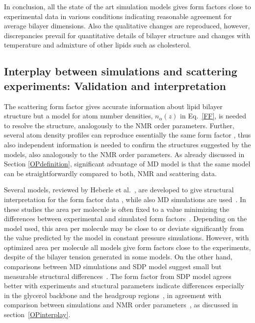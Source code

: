\documentclass[aps,prl,superscriptaddress,twocolumn]{revtex4}
\begin{document}
In conclusion, all the state of the art simulation models gives form factors close to experimental
data in various conditions indicating reasonable agreement for average bilayer dimensions. Also the qualitative changes are reproduced, however, 
discrepancies prevail for quantitative details of bilayer structure and changes with temperature and admixture of other lipids such as cholesterol.


\subsection{Interplay between simulations and scattering experiments: Validation and interpretation}
The scattering form factor gives accurate information about lipid
bilayer structure but a model for atom number densities, $n_\alpha(z)$ in Eq.~\ref{FF}, is needed to 
resolve the structure, analogously to the NMR order parameters. Further, several atom density
profiles can reproduce essentially the same form factor \cite{kucerka08a}, thus also independent information is needed to 
confirm the structures suggested by the models, also analogously to the NMR order parameters. 
As already discussed in Section \ref{OPdefinition}, significant advantage of MD model is that the same model 
can be straightforwardly compared to both, NMR and scattering data.

Several models, reviewed by Heberle et al.~\cite{heberle12}, are developed to give structural interpretation 
for the form factor data \cite{fogarty15},  while also MD simulations are 
used~\cite{sachs03,klauda06,kucerka08a,kucerka08b,braun13}. In these studies the area per molecule 
is often fixed to a value minimizing the differences between experimental and simulated form 
factors~\cite{sachs03,klauda06,kucerka08a,kucerka08b,braun13}. Depending on the model used, this
area per molecule may be close to \cite{braun13} or deviate 
significantly \cite{sachs03,klauda06,kucerka08a,kucerka08b} from the value predicted 
by the model in constant pressure simulations. However, with optimized area per molecule all models give
form factors close to the experiments, despite of the bilayer tension generated in some models.
On the other hand, comparisons between MD simulations and SDP model suggest small but measurable 
structural differences~\cite{kucerka08a,braun13}. The form factor from SDP model agrees better
with experiments and stuctural parameters indicate differences especially in the 
glycerol backbone and the headgroup regions~\cite{kucerka08a,braun13}, 
in agreement with comparison between simulations and NMR order parameters~\cite{botan15}, 
as discussed in section~\ref{OPinterplay}.
\end{document}
